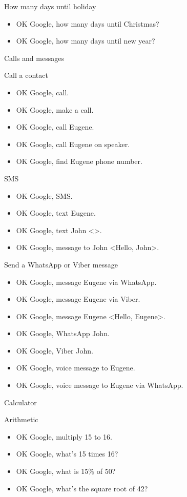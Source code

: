 \documentclass[
  a4paper,
]{article}
\providecommand{\tightlist}{%
  \setlength{\itemsep}{0pt}\setlength{\parskip}{0pt}}\usepackage{longtable,booktabs,array}
\begin{document}
How many days until holiday

\begin{itemize}
\tightlist
\item
  OK Google, how many days until Christmas?
\item
  OK Google, how many days until new year?
\end{itemize}

Calls and messages

Call a contact

\begin{itemize}
\tightlist
\item
  OK Google, call.
\item
  OK Google, make a call.
\item
  OK Google, call Eugene.
\item
  OK Google, call Eugene on speaker.
\item
  OK Google, find Eugene phone number.
\end{itemize}

SMS

\begin{itemize}
\tightlist
\item
  OK Google, SMS.
\item
  OK Google, text Eugene.
\item
  OK Google, text John \textless{}\textgreater.
\item
  OK Google, message to John \textless Hello, John\textgreater.
\end{itemize}

Send a WhatsApp or Viber message

\begin{itemize}
\tightlist
\item
  OK Google, message Eugene via WhatsApp.
\item
  OK Google, message Eugene via Viber.
\item
  OK Google, message Eugene \textless Hello, Eugene\textgreater.
\item
  OK Google, WhatsApp John.
\item
  OK Google, Viber John.
\item
  OK Google, voice message to Eugene.
\item
  OK Google, voice message to Eugene via WhatsApp.
\end{itemize}

Calculator

Arithmetic

\begin{itemize}
\tightlist
\item
  OK Google, multiply 15 to 16.
\item
  OK Google, what's 15 times 16?
\item
  OK Google, what is 15\% of 50?
\item
  OK Google, what's the square root of 42?
\end{itemize}
\end{document}
